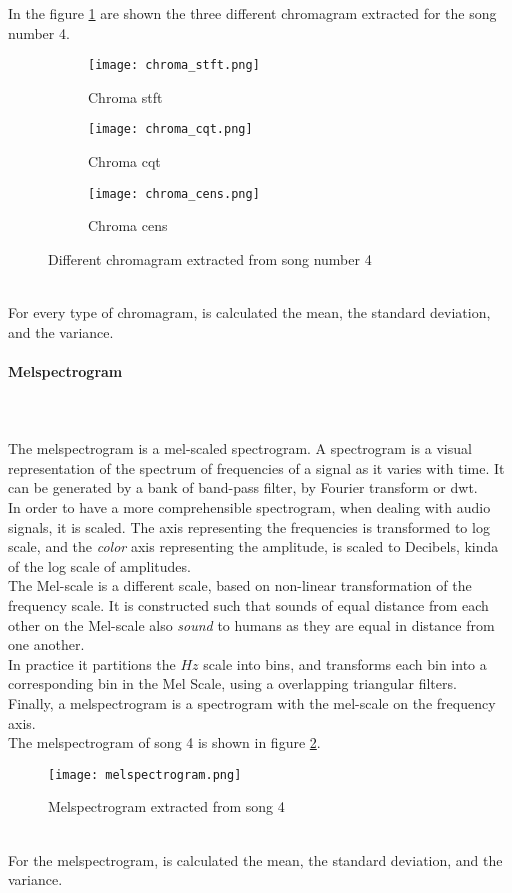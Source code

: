 In the figure \ref{fig:chroma} are shown the three different chromagram extracted for the song number 4.
\begin{figure}[h]
    \centering
    \begin{subfigure}{{\textwidth}}
    		\texttt{[image: chroma\_stft.png]}
    		\caption{Chroma stft}
    \end{subfigure}
    \begin{subfigure}{\textwidth}
    		\texttt{[image: chroma\_cqt.png]} 
    		\caption{Chroma cqt}
    \end{subfigure}
    \begin{subfigure}{\textwidth}
    		\texttt{[image: chroma\_cens.png]} 
    		\caption{Chroma cens}
    \end{subfigure}
    \caption{Different chromagram extracted from song number 4}
    \label{fig:chroma}
\end{figure}
\\
For every type of chromagram, is calculated the mean, the standard deviation, and the variance.

\paragraph{Melspectrogram}
\mbox{} \\ \\
The melspectrogram is a mel-scaled spectrogram. A spectrogram is a visual representation of the spectrum of frequencies of a signal as it varies with time. It can be generated by a bank of band-pass filter, by Fourier transform or \gls{dwt}.
\\ \indent
In order to have a more comprehensible spectrogram, when dealing with audio signals, it is scaled. The axis representing the frequencies is transformed to log scale, and the \textit{color} axis representing the amplitude, is scaled to Decibels, kinda of the log scale of amplitudes.
\\ \indent
The Mel-scale is a different scale, based on non-linear transformation of the frequency scale. It is constructed such that sounds of equal distance from each other on the Mel-scale also \textit{sound} to humans as they are equal in distance from one another.
\\
In practice it partitions the $Hz$ scale into bins, and transforms each bin into a corresponding bin in the Mel Scale, using a overlapping triangular filters.
\\
Finally, a melspectrogram is a spectrogram with the mel-scale on the frequency axis.
\\
The melspectrogram of song 4 is shown in figure \ref{fig:melspectrogram}.
\begin{figure}[h]
    \centering
    \texttt{[image: melspectrogram.png]} 
	\caption{Melspectrogram extracted from song 4}
    \label{fig:melspectrogram}
\end{figure}
\\
For the melspectrogram, is calculated the mean, the standard deviation, and the variance.

